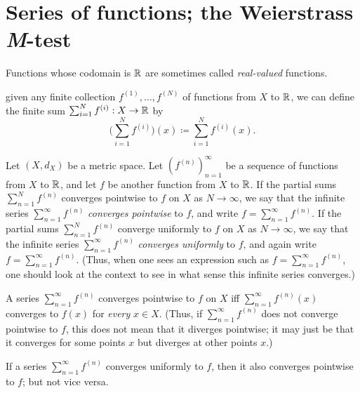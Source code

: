 \section{Series of functions; the Weierstrass \emph{M}-test}\label{ii:sec:3.5}

\begin{note}
  Functions whose codomain is \(\mathbb{R}\) are sometimes called \emph{real-valued} functions.
\end{note}

\begin{note}
  given any finite collection \(f^{(1)}, \dots, f^{(N)}\) of functions from \(X\) to \(\mathbb{R}\), we can define the finite sum \(\sum_{i = 1}^N f^{(i)} : X \to \mathbb{R}\) by
  \[
    \bigg(\sum_{i = 1}^N f^{(i)}\bigg)(x) \coloneqq \sum_{i = 1}^N f^{(i)}(x).
  \]
\end{note}

\setcounter{thm}{1}
\begin{defn}\label{ii:3.5.2}
  Let \((X, d_X)\) be a metric space.
  Let \((f^{(n)})_{n = 1}^\infty\) be a sequence of functions from \(X\) to \(\mathbb{R}\), and let \(f\) be another function from \(X\) to \(\mathbb{R}\).
  If the partial sums \(\sum_{n = 1}^N f^{(n)}\) converges pointwise to \(f\) on \(X\) as \(N \to \infty\), we say that the infinite series \(\sum_{n = 1}^\infty f^{(n)}\) \emph{converges pointwise} to \(f\), and write \(f = \sum_{n = 1}^\infty f^{(n)}\).
  If the partial sums \(\sum_{n = 1}^N f^{(n)}\) converge uniformly to \(f\) on \(X\) as \(N \to \infty\), we say that the infinite series \(\sum_{n = 1}^\infty f^{(n)}\) \emph{converges uniformly} to \(f\), and again write \(f = \sum_{n = 1}^\infty f^{(n)}\).
  (Thus, when one sees an expression such as \(f = \sum_{n = 1}^\infty f^{(n)}\), one should look at the context to see in what sense this infinite series converges.)
\end{defn}

\begin{rmk}\label{ii:3.5.3}
  A series \(\sum_{n = 1}^\infty f^{(n)}\) converges pointwise to \(f\) on \(X\) iff \(\sum_{n = 1}^\infty f^{(n)}(x)\) converges to \(f(x)\) for \emph{every} \(x \in X\).
  (Thus, if \(\sum_{n = 1}^\infty f^{(n)}\) does not converge pointwise to \(f\), this does not mean that it diverges pointwise;
  it may just be that it converges for some points \(x\) but diverges at other points \(x\).)
\end{rmk}

\begin{note}
  If a series \(\sum_{n = 1}^\infty f^{(n)}\) converges uniformly to \(f\), then it also converges pointwise to \(f\);
  but not vice versa.
\end{note}

